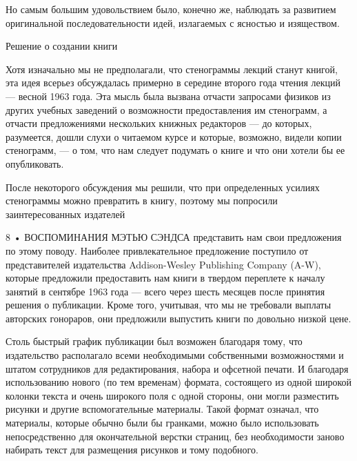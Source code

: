 \documentclass[11pt,oneside]{article}
\begin{document}
Но самым большим удовольствием было, конечно же, наблюдать за развитием оригинальной последовательности идей, излагаемых с ясностью и изяществом.\par



Решение о создании книги\par



Хотя изначально мы не предполагали, что стенограммы лекций станут книгой, эта идея всерьез обсуждалась примерно в середине второго года чтения лекций --- весной 1963 года. Эта мысль была вызвана отчасти запросами физиков из других учебных заведений о возможности предоставления им стенограмм, а отчасти предложениями нескольких книжных редакторов --- до которых, разумеется, дошли слухи о читаемом курсе и которые, возможно, видели копии стенограмм, --- о том, что нам следует подумать о книге и что они хотели бы ее опубликовать.\par



После некоторого обсуждения мы решили, что при определенных усилиях стенограммы можно превратить в книгу, поэтому мы попросили заинтересованных издателей\par



8 • ВОСПОМИНАНИЯ МЭТЬЮ СЭНДСА представить нам свои предложения по этому поводу. Наиболее привлекательное предложение поступило от представителей издательства Addison-Wesley Publishing Company (A-W), которые предложили предоставить нам книги в твердом переплете к началу занятий в сентябре 1963 года --- всего через шесть месяцев после принятия решения о публикации. Кроме того, учитывая, что мы не требовали выплаты авторских гонораров, они предложили выпустить книги по довольно низкой цене.\par



Столь быстрый график публикации был возможен благодаря тому, что издательство располагало всеми необходимыми собственными возможностями и штатом сотрудников для редактирования, набора и офсетной печати. И благодаря использованию нового (по тем временам) формата, состоящего из одной широкой колонки текста и очень широкого поля с одной стороны, они могли разместить рисунки и другие вспомогательные материалы. Такой формат означал, что материалы, которые обычно были бы гранками, можно было использовать непосредственно для окончательной верстки страниц, без необходимости заново набирать текст для размещения рисунков и тому подобного.\par
\end{document}
